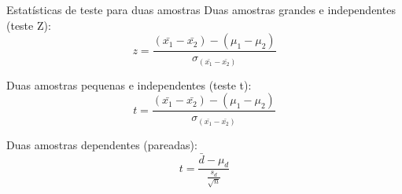 \documentclass{beamer}
\begin{document}
\begin{frame}{Estatísticas de teste para duas amostras}
  Duas amostras grandes e independentes (teste Z):
  \begin{displaymath}
    z = \frac{ (\bar{x_1} - \bar{x_2}) - (\mu_1 - \mu_2)
    }{\sigma_{(\bar{x_1} - \bar{x_2})}}
  \end{displaymath}

  Duas amostras pequenas e independentes (teste t):
  \begin{displaymath}
    t = \frac{ (\bar{x_1} - \bar{x_2}) - (\mu_1 - \mu_2)
    }{\sigma_{(\bar{x_1} - \bar{x_2})}}
  \end{displaymath}


    Duas amostras dependentes (pareadas):
    \begin{displaymath}
      t = \frac{\bar{d} - \mu_d}{\frac{s_d}{\sqrt{n}}}
    \end{displaymath}
    
  \end{frame}
\end{document}
